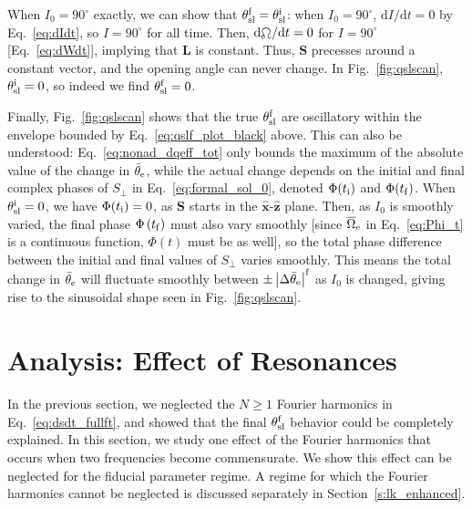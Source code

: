 \documentclass[
        twocolumn,
        twocolappendix
    ]{aastex63}
\newcommand*{\rdil}[2]{\mathrm{d}#1 / \mathrm{d}#2}
\newcommand*{\abs}[1]{\left|#1\right|}
\renewcommand*{\bm}[1]{\boldsymbol{\mathbf{#1}}}
\newcommand*{\uv}[1]{\hat{\bm{#1}}}
\newcommand*{\p}[1]{\left(#1\right)}
\begin{document}
When $I_0 = 90^\circ$ exactly, we can show that $\theta_{\rm sl}^{\rm f} =
\theta_{\rm sl}^{\rm i}$: when $I_0 = 90^\circ$, $\rdil{I}{t} = 0$ by
Eq.~\eqref{eq:dIdt}, so $I = 90^\circ$ for all time. Then, $\rdil{\ascnode}{t} =
0$ for $I = 90^\circ$ [Eq.~\eqref{eq:dWdt}], implying that $\bm{L}$ is constant.
Thus, $\bm{S}$ precesses around a constant vector, and the opening angle can
never change. In Fig.~\ref{fig:qslscan}, $\theta_{\rm sl}^{\rm i} = 0$, so
indeed we find $\theta_{\rm sl}^{\rm f} = 0$.

Finally, Fig.~\ref{fig:qslscan} shows that the true $\theta_{\rm sl}^{\rm f}$
are oscillatory within the envelope bounded by Eq.~\eqref{eq:qslf_plot_black}
above. This can also be understood: Eq.~\eqref{eq:nonad_dqeff_tot} only bounds
the maximum of the absolute value of the change in $\bar{\theta}_{\rm e}$, while
the actual change depends on the initial and final complex phases of $S_{\perp}$
in Eq.~\eqref{eq:formal_sol_0}, denoted $\Phi(t_{\rm i})$ and $\Phi(t_{\rm f})$.
When $\theta_{\rm sl}^{\rm i} = 0$, we have $\Phi(t_{\rm i}) = 0$, as $\bm{S}$
starts in the $\uv{x}$-$\uv{z}$ plane. Then, as $I_0$ is smoothly varied, the
final phase $\Phi\p{t_{\rm f}}$ must also vary smoothly [since
$\overline{\Omega}_{\rm e}$ in Eq.~\eqref{eq:Phi_t} is a continuous function,
$\Phi\p{t}$ must be as well], so the total phase difference between the initial
and final values of $S_{\perp}$ varies smoothly. This means the total change in
$\bar{\theta}_{\rm e}$ will fluctuate smoothly between $\pm \abs{\Delta
\bar{\theta}_{\rm e}}^{\rm f}$ as $I_0$ is changed, giving rise to the
sinusoidal shape seen in Fig.~\ref{fig:qslscan}.

\section{Analysis: Effect of Resonances}\label{s:harmonic}

In the previous section, we neglected the $N \geq 1$ Fourier harmonics in
Eq.~\eqref{eq:dsdt_fullft}, and showed that the final $\theta_{\rm sl}^{\rm f}$
behavior could be completely explained. In this section, we study one effect of
the Fourier harmonics that occurs when two frequencies become commensurate. We
show this effect can be neglected for the fiducial parameter regime. A regime
for which the Fourier harmonics cannot be neglected is discussed separately in
Section~\ref{s:lk_enhanced}.
\end{document}
